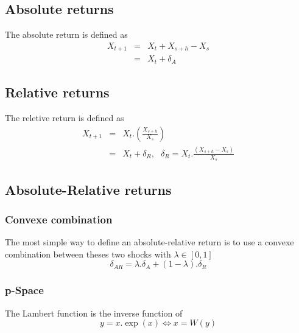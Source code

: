 \documentclass[3pt]{article}
\begin{document}
\subsection{Absolute returns}

The absolute return is defined as%
\begin{eqnarray*}
X_{t+1} &=&X_{t}+X_{s+h}-X_{s} \\
&=&X_{t}+\delta _{A}
\end{eqnarray*}

\subsection{Relative returns}

\bigskip The reletive return is defined as%
\begin{eqnarray*}
X_{t+1} &=&X_{t}.\left( \frac{X_{s+h}}{X_{s}}\right) \\
&=&X_{t}+\delta _{R},\text{ \ \ }\delta _{R}=X_{t}.\frac{\left(
X_{s+h}-X_{s}\right) }{X_{s}}
\end{eqnarray*}

\subsection{Absolute-Relative returns}

\bigskip

\subsubsection{Convexe combination}

The most simple way to define an absolute-relative return is to use a
convexe combination between theses two shocks with $\lambda \in \left[ 0,1%
\right] $ 
\begin{equation*}
\delta _{AR}=\lambda .\delta _{A}+(1-\lambda ).\delta _{R}
\end{equation*}

\subsubsection{p-Space}

\bigskip

\bigskip

\bigskip

The Lambert function is the inverse function of 
\begin{equation*}
y=x.\exp (x)\Longleftrightarrow x=W(y)
\end{equation*}
\end{document}
